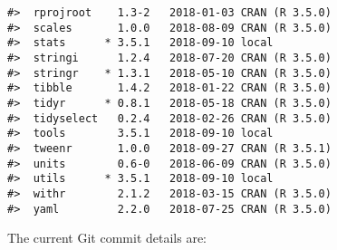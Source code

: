 \documentclass[]{article}
\begin{document}
\begin{verbatim}
#>  rprojroot    1.3-2   2018-01-03 CRAN (R 3.5.0)
#>  scales       1.0.0   2018-08-09 CRAN (R 3.5.0)
#>  stats      * 3.5.1   2018-09-10 local         
#>  stringi      1.2.4   2018-07-20 CRAN (R 3.5.0)
#>  stringr    * 1.3.1   2018-05-10 CRAN (R 3.5.0)
#>  tibble       1.4.2   2018-01-22 CRAN (R 3.5.0)
#>  tidyr      * 0.8.1   2018-05-18 CRAN (R 3.5.0)
#>  tidyselect   0.2.4   2018-02-26 CRAN (R 3.5.0)
#>  tools        3.5.1   2018-09-10 local         
#>  tweenr       1.0.0   2018-09-27 CRAN (R 3.5.1)
#>  units        0.6-0   2018-06-09 CRAN (R 3.5.0)
#>  utils      * 3.5.1   2018-09-10 local         
#>  withr        2.1.2   2018-03-15 CRAN (R 3.5.0)
#>  yaml         2.2.0   2018-07-25 CRAN (R 3.5.0)
\end{verbatim}

The current Git commit details are:
\end{document}
